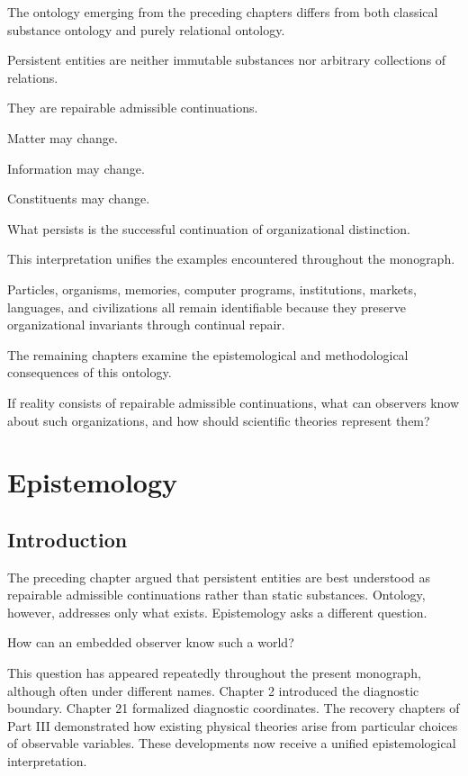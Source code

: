 \documentclass[11pt,oneside]{book}
\numberwithin{equation}{chapter}
\theoremstyle{definition}
\theoremstyle{plain}
\begin{document}
The ontology emerging from the preceding chapters differs from both
classical substance ontology and purely relational ontology.

Persistent entities are neither immutable substances nor arbitrary
collections of relations.

They are repairable admissible continuations.

Matter may change.

Information may change.

Constituents may change.

What persists is the successful continuation of organizational distinction.

This interpretation unifies the examples encountered throughout the
monograph.

Particles, organisms, memories, computer programs, institutions, markets,
languages, and civilizations all remain identifiable because they preserve
organizational invariants through continual repair.

The remaining chapters examine the epistemological and methodological
consequences of this ontology.

If reality consists of repairable admissible continuations, what can
observers know about such organizations, and how should scientific theories
represent them?

\chapter{Epistemology}

\section{Introduction}

The preceding chapter argued that persistent entities are best understood
as repairable admissible continuations rather than static substances.
Ontology, however, addresses only what exists. Epistemology asks a
different question.

How can an embedded observer know such a world?

This question has appeared repeatedly throughout the present monograph,
although often under different names. Chapter 2 introduced the diagnostic
boundary. Chapter 21 formalized diagnostic coordinates. The recovery
chapters of Part III demonstrated how existing physical theories arise from
particular choices of observable variables. These developments now receive
a unified epistemological interpretation.
\end{document}
